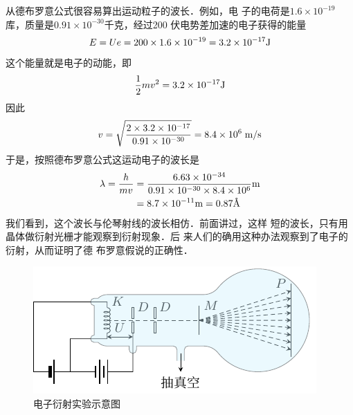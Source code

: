 从德布罗意公式很容易算出运动粒子的波长．例如，电
子的电荷是$1.6\times10^{-19}$
库，质量是$0.91\times10^{-30}$千克，经过200
伏电势差加速的电子获得的能量
\[E=Ue=200\times1.6\times10^{-19}=3.2\times10^{-17}{\rm J}\]
这个能量就是电子的动能，即
\[\dfrac{1}{2}mv^2=3.2\times10^{-17}{\rm J} \]
因此
\[v=\sqrt{\frac{2\times 3.2\times10^{-17}}{0.91\times 10^{-30}}}=8.4\times10^6\;\text{m}/\text{s} \]
于是，按照德布罗意公式这运动电子的波长是
\[\begin{split}
    \lambda=\dfrac{h}{mv}&=\frac{6.63\times 10^{-34}}{0.91\times10^{-30}\times8.4\times 10^6}{\rm m} \\
&=8.7\times10^{-11}{\rm m}=0.87\text{\AA}
\end{split}\]
我们看到，这个波长与伦琴射线的波长相仿．前面讲过，这样
短的波长，只有用晶体做衍射光栅才能观察到衍射现象．后
来人们的确用这种办法观察到了电子的衍射，从而证明了德
布罗意假说的正确性．
\begin{figure}[htbp]
    \centering
    \includegraphics{fig/C/7-5.pdf}
    \caption{电子衍射实验示意图}\label{fig_C_7-5}
\end{figure}

